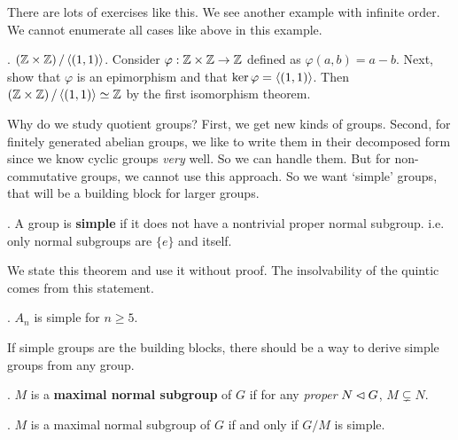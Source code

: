 There are lots of exercises like this. We see another example with infinite order. We cannot enumerate all cases like above in this example.

\ex. \((\mathbb{Z} \times \mathbb{Z}) \operatorname{/} \left\langle (1, 1) \right\rangle\). Consider \(\varphi : \mathbb{Z} \times \mathbb{Z} \rightarrow \mathbb{Z}\) defined as \(\varphi(a, b) = a - b\). Next, show that \(\varphi\) is an epimorphism and that \(\ker\varphi = \left\langle (1, 1) \right\rangle\). Then \((\mathbb{Z} \times \mathbb{Z}) \operatorname{/} \left\langle (1, 1) \right\rangle \simeq \mathbb{Z}\) by the first isomorphism theorem.

Why do we study quotient groups? First, we get new kinds of groups. Second, for finitely generated abelian groups, we like to write them in their decomposed form since we know cyclic groups \textit{very} well. So we can handle them. But for non-commutative groups, we cannot use this approach. So we want `simple' groups, that will be a building block for larger groups.

.  A group is \textbf{simple} if it does not have a nontrivial proper normal subgroup. i.e. only normal subgroups are \(\{e\}\) and itself.

We state this theorem and use it without proof. The insolvability of the quintic comes from this statement.

\thm. \(A_n\) is simple for \(n \geq 5\).

If simple groups are the building blocks, there should be a way to derive simple groups from any group.

.  \(M\) is a \textbf{maximal normal subgroup} of \(G\) if for any \textit{proper} \(N \lhd G\), \(M \subsetneq N\).

\thm. \(M\) is a maximal normal subgroup of \(G\) if and only if \(G/M\) is simple.

\pagebreak
